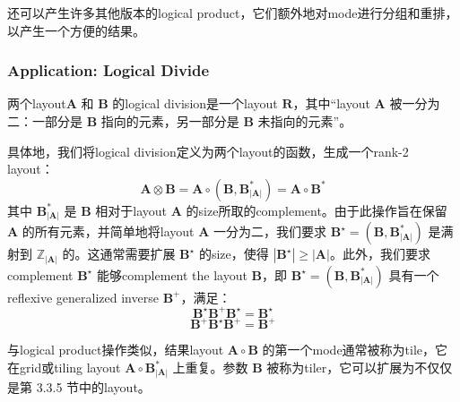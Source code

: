 \documentclass{article}
\begin{document}
还可以产生许多其他版本的logical product，它们额外地对mode进行分组和重排，以产生一个方便的结果。

\subsubsection{Application: Logical Divide}
两个layout\(\mathbf{A}\) 和 \(\mathbf{B}\) 的logical division是一个layout \(\mathbf{R}\)，其中“layout \(\mathbf{A}\) 被一分为二：一部分是 \(\mathbf{B}\) 指向的元素，另一部分是 \(\mathbf{B}\) 未指向的元素”。

具体地，我们将logical division定义为两个layout的函数，生成一个rank-2 layout：
\[
\mathbf{A} \otimes \mathbf{B} = \mathbf{A} \circ (\mathbf{B}, \mathbf{B}^*_{|\mathbf{A}|}) = \mathbf{A} \circ \mathbf{B}^*
\]
其中 \( \mathbf{B}^*_{|\mathbf{A}|} \) 是 \( \mathbf{B} \) 相对于layout \( \mathbf{A} \) 的size所取的complement。由于此操作旨在保留 \( \mathbf{A} \) 的所有元素，并简单地将layout \( \mathbf{A} \) 一分为二，我们要求 \( \mathbf{B}^\star = (\mathbf{B}, \mathbf{B}^*_{|\mathbf{A}|}) \) 是满射到 \( \mathbb{Z}_{|\mathbf{A}|} \) 的。这通常需要扩展 \( \mathbf{B}^\star \) 的size，使得 \( |\mathbf{B}^\star| \geq |\mathbf{A}| \)。此外，我们要求complement \( \mathbf{B}^\star \) 能够complement the layout \( \mathbf{B} \)，即 \( \mathbf{B}^\star = (\mathbf{B}, \mathbf{B}^*_{|\mathbf{A}|}) \) 具有一个reflexive generalized inverse \( \mathbf{B}^+ \)，满足：
\[
\mathbf{B}^\star \mathbf{B}^+ \mathbf{B}^\star = \mathbf{B}^\star \tag{30}
\]
\[
\mathbf{B}^+ \mathbf{B}^\star \mathbf{B}^+ = \mathbf{B}^+ \tag{31}
\]

与logical product操作类似，结果layout \( \mathbf{A} \circ \mathbf{B} \) 的第一个mode通常被称为tile，它在grid或tiling layout \( \mathbf{A} \circ \mathbf{B}^*_{|\mathbf{A}|} \) 上重复。参数 \( \mathbf{B} \) 被称为tiler，它可以扩展为不仅仅是第 3.3.5 节中的layout。
\end{document}
